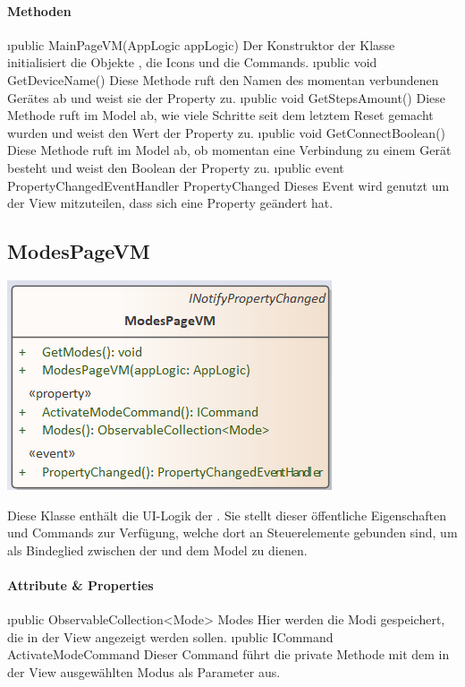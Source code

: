 \documentclass[../entwurf.tex]{subfiles}
\begin{document}
\paragraph{Methoden}
\begin{itemize}
	\i{public MainPageVM(AppLogic appLogic)} Der Konstruktor der Klasse initialisiert die Objekte , die Icons und die Commands.
	\i{public void GetDeviceName()} Diese Methode ruft den Namen des momentan verbundenen Gerätes ab und weist sie der Property  zu.
	\i{public void GetStepsAmount()} Diese Methode ruft im Model ab, wie viele Schritte seit dem letztem Reset gemacht wurden und weist den Wert der Property  zu.
	\i{public void GetConnectBoolean()} Diese Methode ruft im Model ab, ob momentan eine Verbindung zu einem Gerät besteht und weist den Boolean der Property  zu.
	\i{public event PropertyChangedEventHandler PropertyChanged} Dieses Event wird genutzt um der View mitzuteilen, dass sich eine Property geändert hat.
\end{itemize}
\subsection{ModesPageVM}
\begin{minipage}{0.55\textwidth}
\includegraphics[scale=0.75]{../graphics/vm_klassen/ModesPageVM.png}
\end{minipage}
\begin{minipage}{0.45\textwidth}
Diese Klasse enthält die UI-Logik der . Sie stellt dieser öffentliche Eigenschaften und Commands zur Verfügung, welche dort an Steuerelemente gebunden sind, um als Bindeglied zwischen der  und dem Model zu dienen.
\end{minipage}
\paragraph{Attribute \& Properties}
\begin{itemize}
	\i{public ObservableCollection<Mode> Modes} Hier werden die Modi gespeichert, die in der View angezeigt werden sollen.
	\i{public ICommand ActivateModeCommand} Dieser Command führt die private Methode  mit dem in der View ausgewählten Modus als Parameter aus.
\end{itemize}
\end{document}
